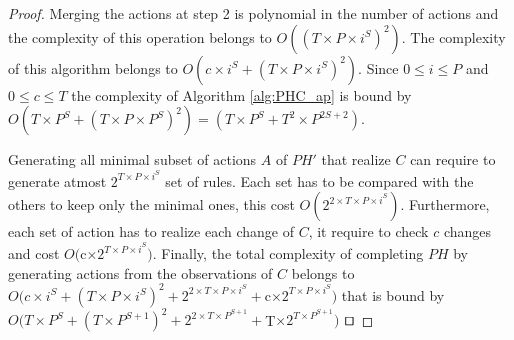 \begin{theorem}[Complexity]
\begin{proof}
		Merging the actions at step 2 is polynomial in the number of actions and the complexity of this operation belongs to $O((T\times P\times i^S)^2)$.
		The complexity of this algorithm belongs to $O(c\times i^S + (T\times P\times i^S)^2)$.
		Since $0 \leq i \leq P$ and $0 \leq c \leq T$ the complexity of Algorithm \ref{alg:PHC_ap} is bound by $O(T\times P^S + (T\times P\times P^S)^2) = (T\times P^S + T^2\times P^{2S+2})$.
		
		Generating all minimal subset of actions $A$ of $PH'$ that realize $C$ can require to generate atmost $2^{T\times  P \times  i^S}$ set of rules.
		Each set has to be compared with the others to keep only the minimal ones, this cost $O(2^{2\times T\times  P \times  i^S})$.
		Furthermore, each set of action has to realize each change of $C$, it require to check $c$ changes and cost $O($c$ \times  2^{T\times  P \times  i^S})$.
		Finally, the total complexity of completing $PH$ by generating actions from the observations of $C$ belongs to
		$O(c\times i^S + (T\times P\times i^S)^2 + 2^{2\times T\times  P \times  i^S} + $c$ \times  2^{T\times  P \times  i^S})$ that is bound by $O(T\times P^S + (T\times P^{S+1})^2 + 2^{2\times T\times P^{S+1}} + $T$ \times  2^{T\times  P^{S+1}})$
		$\qed$
	\end{proof}
\end{theorem}




